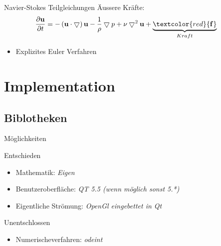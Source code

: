 \documentclass{beamer}
\begin{document}
\begin{frame}{Navier-Stokes Teilgleichungen}
	\"Aussere Kr\"afte:
	\begin{align*}
 	 \frac{\partial \mathbf{u}}{\partial t} &= - \left( \mathbf{u} \cdot \bigtriangledown \right) \mathbf{u} - \frac{1}{\rho} \bigtriangledown p + \nu \bigtriangledown^2 \mathbf{u} + \underbrace{\textcolor{red}{\mathbf{f}}}_{\substack{Kraft}}
	\end{align*}
	\begin{itemize}
	\item  Explizites Euler Verfahren
	\end{itemize}
\end{frame}


\section{Implementation}
  \subsection{Biblotheken}
  \begin{frame}{M\"oglichkeiten}
  \begin{block}{Entschieden}
    \begin{itemize}
      \item Mathematik: \textit{Eigen}
      \item Benutzeroberfl\"ache: \textit{QT 5.5 (wenn m\"oglich sonst 5.*)} 
      \item Eigentliche Str\"omung: \textit{OpenGl eingebettet in Qt}
    \end{itemize}
  \end{block}
  \begin{block}{Unentschlossen}
    \begin{itemize}
      \item Numerischeverfahren: \textit{odeint}
    \end{itemize}
  \end{block}
    \end{frame}
\end{document}
